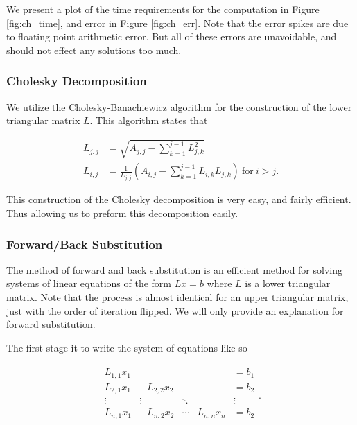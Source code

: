 \documentclass[../fem.tex]{subfiles}
\begin{document}
We present a plot of the time requirements for the computation in
Figure \ref{fig:ch_time}, and error in Figure \ref{fig:ch_err}. Note that the
error spikes are due to floating point arithmetic error. But all of these
errors are unavoidable, and should not effect any solutions too much.

\subsubsection{Cholesky Decomposition}%
\label{ssub:cholesky_decomposition}


We utilize the Cholesky-Banachiewicz algorithm for the construction of the
lower triangular matrix $L$. This algorithm states that

\begin{align*}
  L_{j,j}&=\sqrt{A_{j,j}-\sum_{k=1}^{j-1}L_{j,k}^2}\\
  L_{i,j}&=\frac{1}{L_{j,j}}\left(A_{i,j}-\sum_{k=1}^{j-1}L_{i,k}L_{j,k}\right)\
  \text{for}\ i>j.
\end{align*}

This construction of the Cholesky decomposition is very easy, and fairly
efficient. Thus allowing us to preform this decomposition easily.

\subsubsection{Forward/Back Substitution}%
\label{ssub:forward_back_substitution}

The method of forward and back substitution is an efficient method for solving
systems of linear equations of the form $Lx=b$ where $L$ is a lower triangular
matrix. Note that the process is almost identical for an upper triangular
matrix, just with the order of iteration flipped. We will only provide an
explanation for forward substitution.

The first stage it to write the system of equations like so

\begin{align*}
  \begin{matrix}
    L_{1,1}x_1 & & & & =b_1\\
    L_{2,1}x_1 & +L_{2,2}x_2 & & & =b_2\\
    \vdots & \vdots & \ddots & & \vdots\\
    L_{n,1}x_1 & +L_{n,2}x_2 & \cdots & L_{n,n}x_n & =b_2\\
  \end{matrix}.
\end{align*}
\end{document}
